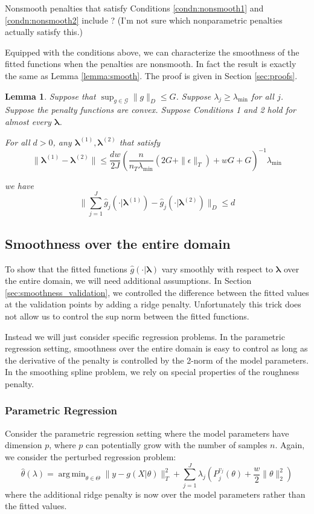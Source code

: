 \documentclass[12pt]{article}
\newtheorem{lemma}{Lemma}
\DeclareMathOperator*{\argmin}{arg\,min}
\begin{document}
Nonsmooth penalties that satisfy Conditions \ref{condn:nonsmooth1} and \ref{condn:nonsmooth2} include ? (I'm not sure which nonparametric penalties actually satisfy this.)

Equipped with the conditions above, we can characterize the smoothness of the fitted functions when the penalties are nonsmooth. In fact the result is exactly the same as Lemma \ref{lemma:smooth}. The proof is given in Section \ref{sec:proofs}.

\begin{lemma}
\label{lemma:nonsmooth}
Suppose that $\sup_{g\in\mathcal{G}}\|g\|_{D}\le G$.
Suppose $\lambda_j \ge \lambda_{\min}$ for all $j$.
Suppose the penalty functions are convex.
Suppose Conditions 1 and 2 hold for almost every $\boldsymbol{\lambda}$.

For all $d>0$, any $\boldsymbol \lambda^{(1)}, \boldsymbol \lambda^{(2)}$ that satisfy
\[
\|\boldsymbol \lambda^{(1)}- \boldsymbol \lambda^{(2)}\|\le\frac{dw}{2J}\left(\frac{n}{n_T \lambda_{\min} }\left(2G+\|\epsilon\|_{T}\right)+wG+G\right)^{-1}\lambda_{\min}
\]

we have
\[
\|\sum_{j=1}^{J}\hat{g}_{j}(\cdot| \boldsymbol \lambda^{(1)})-\hat{g}_{j}(\cdot| \boldsymbol \lambda^{(2)})\|_{D}\le d
\]
\end{lemma}

\subsection{Smoothness over the entire domain}
\label{sec:smoothness_domain}

To show that the fitted functions $\hat{g}(\cdot | \boldsymbol \lambda)$ vary smoothly with respect to $\boldsymbol \lambda$ over the entire domain, we will need additional assumptions. In Section \ref{sec:smoothness_validation}, we controlled the difference between the fitted values at the validation points by adding a ridge penalty. Unfortunately this trick does not allow us to control the sup norm between the fitted functions.

Instead we will just consider specific regression problems. In the parametric regression setting, smoothness over the entire domain is easy to control as long as the derivative of the penalty is controlled by the 2-norm of the model parameters. In the smoothing spline problem, we rely on special properties of the roughness penalty.

\subsubsection{Parametric Regression}
Consider the parametric regression setting where the model parameters have dimension $p$, where $p$ can potentially grow with the number of samples $n$. Again, we consider the perturbed regression problem:
\begin{equation}
\hat{\theta}(\lambda) = \argmin_{\theta \in \Theta} \| y -  g(X| \theta) \|^2_T + \sum_{j=1}^J \lambda_j \left ( P^{v_j}_j(\theta) + \frac{w}{2} \| \theta \|^2_2 \right )
\end{equation}
where the additional ridge penalty is now over the model parameters rather than the fitted values.
\end{document}
